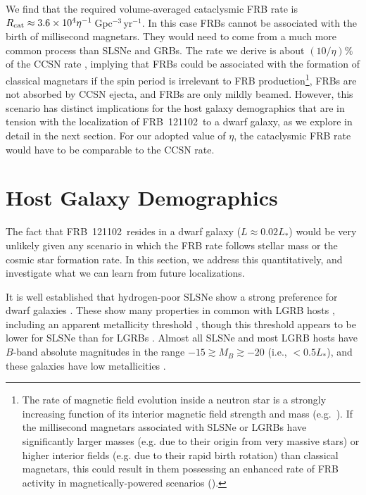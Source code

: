 \documentclass[twocolumn]{aastex6}
\newcommand{\pergpcperyr}{Gpc$^{-3}$\,yr$^{-1}$}
\newcommand{\repeater}{FRB~121102}
\begin{document}
We find that the required volume-averaged cataclysmic FRB rate is $R_{\rm cat} \approx 3.6\times 10^4 \eta^{-1}$\,\pergpcperyr. In this case FRBs cannot be associated with the birth of millisecond magnetars.  They would need to come from a much more common process than SLSNe and GRBs. The rate we derive is about $(10/\eta)\%$ of the CCSN rate \citep{dah2004}, implying that FRBs could be associated with the formation of classical magnetars if the spin period is irrelevant to FRB production\footnote{The rate of magnetic field evolution inside a neutron star is a strongly increasing function of its interior magnetic field strength and mass (e.g.~\citealt{Beloborodov&Li16}). If the millisecond magnetars associated with SLSNe or LGRBs have significantly larger masses (e.g. due to their origin from very massive stars) or higher interior fields (e.g. due to their rapid birth rotation) than classical magnetars, this could result in them possessing an enhanced rate of FRB activity in magnetically-powered scenarios (\citealt{bel2017}).}, FRBs are not absorbed by CCSN ejecta, and FRBs are only mildly beamed. However, this scenario has distinct implications for the host galaxy demographics that are in tension with the localization of \repeater\ to a dwarf galaxy, as we explore in detail in the next section. For our adopted value of $\eta$, the cataclysmic FRB rate would have to be comparable to the CCSN rate.

\section{Host Galaxy Demographics}
\label{s:hosts}

The fact that \repeater\ resides in a dwarf galaxy ($L\approx 0.02 L_*$) would be very unlikely given any scenario in which the FRB rate follows stellar mass or the cosmic star formation rate. In this section, we address this quantitatively, and investigate what we can learn from future localizations.

It is well established that hydrogen-poor SLSNe show a strong preference for dwarf galaxies \citep{nei2011,lun2014,lel2015,ang2016,schu2016}. These show many properties in common with LGRB hosts \citep{lun2014}, including an apparent metallicity threshold \citep{chen2016,per2016}, though this threshold appears to be lower for SLSNe than for LGRBs \citep{schu2016}.  Almost all SLSNe and most LGRB hosts have $B$-band absolute magnitudes in the range $-15\gtrsim M_B\gtrsim -20$ (i.e., $<0.5 L_*$), and these galaxies have low metallicities \citep{chen2013,lun2014}. 
\end{document}
